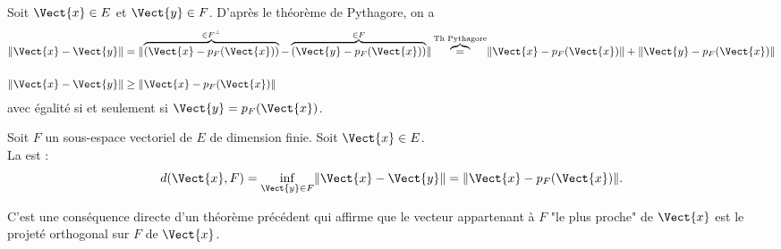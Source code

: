 \documentclass{book}
\begin{document}
\begin{Demonstration}
Soit $\Vect{x} \in E$ et $\Vect{y} \in F$. D'après le théorème de Pythagore, on a
$$\begin{aligned}
\norme{\Vect{x} - \Vect{y}}&=\norme{ \overbrace{(\Vect{x}- p_F(\Vect{x}))}^{\in F^{\perp} }-\overbrace{(\Vect{y}- p_F(\Vect{x}))}^{\in F }}\overbrace{=}^{\text{Th Pythagore}} \norme{\Vect{x}- p_F(\Vect{x})  } +\norme{ \Vect{y}- p_F(\Vect{x}) }\\
\\
\norme{\Vect{x} - \Vect{y}}&\geq \norme{\Vect{x}- p_F(\Vect{x})  }
\end{aligned}$$
avec égalité si et seulement si $\Vect{y} = p_F(\Vect{x})$.
\end{Demonstration}
\begin{DefinitionProposition}
Soit $F$ un sous-espace vectoriel de $E$ de dimension finie. Soit $\Vect{x} \in E$.\\
La   est :
$$d(\Vect{x},F)=\inf_{\Vect{y}\in F} \norme{\Vect{x} - \Vect{y}} = \norme{\Vect{x} - p_F(\Vect{x})} .$$
\end{DefinitionProposition}
\begin{Demonstration}
C'est une conséquence directe d'un théorème précédent qui affirme que le vecteur appartenant à $F$ "le plus proche" de $\Vect{x}$ est le projeté orthogonal sur $F$ de $\Vect{x}$.
\end{Demonstration}
\end{document}
